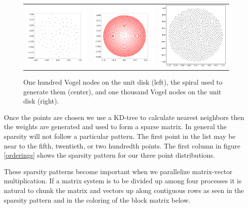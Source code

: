 \documentclass[12pt]{article}
\begin{document}
\begin{figure}
	\centering
	\begin{tabular}{ccc}
		\includegraphics[width=.3\textwidth]{vogel_no_spiral.png} & \includegraphics[width=.3\textwidth]{vogel_spiral.png} &
		\includegraphics[width=.3\textwidth]{vogel_1000_disk.eps} 
	\end{tabular}
	\caption{One hundred Vogel nodes on the unit disk (left), the spiral used to generate them (center), and one thousand Vogel nodes on the unit disk (right).}
	\label{vogel}
\end{figure}

Once the points are chosen we use a KD-tree to calculate nearest neighbors then the weights are generated and used to form a sparse matrix. In general the sparsity will not follow a particular pattern. The first point in the list may be near to the fifth, twentieth, or two hundredth points. The first column in figure \ref{orderings} shows the sparsity pattern for our three point distributions.

These sparsity patterns become important when we parallelize matrix-vector multiplication. If a matrix system is to be divided up among four processes it is natural to chunk the matrix and vectors up along contiguous rows as seen in the sparsity pattern and in the coloring of the block matrix below.
\end{document}
